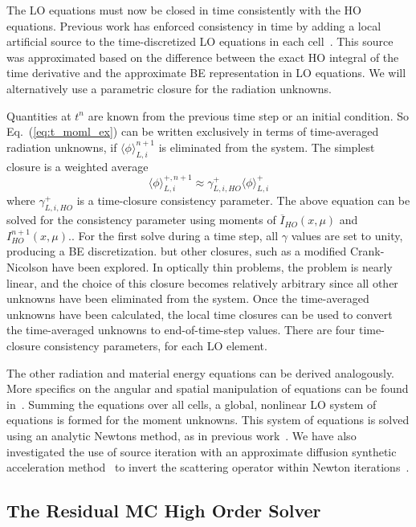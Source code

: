 \documentclass{anstrans}
\renewcommand{\eqref}[1]{(\ref{#1})}
\newcommand{\mom}[1]{\langle #1 \rangle}
\begin{document}
The LO equations must now be closed in time consistently with the HO
equations.   Previous work has enforced
consistency in time by adding a local artificial source to the time-discretized LO
equations in each cell~\cite{holo_rh}.  This
source was approximated based on the difference between the exact HO integral of the time
derivative and the approximate BE representation in LO equations. We will alternatively use a
parametric closure for the radiation unknowns. 

Quantities at $t^{n}$ are known from the previous time step or an initial condition.  
So Eq.~\eqref{eq:t_moml_ex} can be written exclusively in terms
of time-averaged radiation unknowns, if $\mom{\phi}_{L,i}^{n+1}$ is eliminated from the
system.  The simplest closure is a weighted average
\begin{equation}
    \mom{\phi}_{L,i}^{+,n+1} \approx \gamma_{L,i,HO}^+ \mom{\phi}_{L,i}^+
\end{equation}
where $\gamma_{L,i,HO}^+$ is a time-closure consistency parameter.  The above equation can be solved
for the consistency parameter using moments of $\overline{I}_{HO}(x,\mu)$ and $I^{n+1}_{HO}(x,\mu)$..  For the first solve
during a time step, all $\gamma$ values are set to unity, producing a BE discretization.
but other closures, such as a modified Crank-Nicolson have been explored.  In optically
thin problems, the problem is nearly linear, and the choice of this closure becomes
relatively arbitrary since all other unknowns have been eliminated from the system.
Once the time-averaged unknowns have been calculated,
the local time closures can be used to convert the time-averaged unknowns to end-of-time-step
values.  There are four time-closure consistency parameters, for each LO element. 

The other radiation and material energy equations can be derived analogously.  More specifics on the angular and spatial
manipulation of equations can be found in~\cite{bolding_nse}.  
Summing the equations over all cells, a global, nonlinear LO system of equations is formed
for the moment unknowns.  This system of equations is solved using an analytic Newtons method, as in
previous work~\cite{bolding_nse}.  We have also investigated the use of source iteration
with an approximate diffusion synthetic acceleration method~\cite{wsa} to invert the scattering
operator within Newton iterations~\cite{wla}. 

\subsection*{The Residual MC High Order Solver}
\label{sec:ho}
\end{document}
